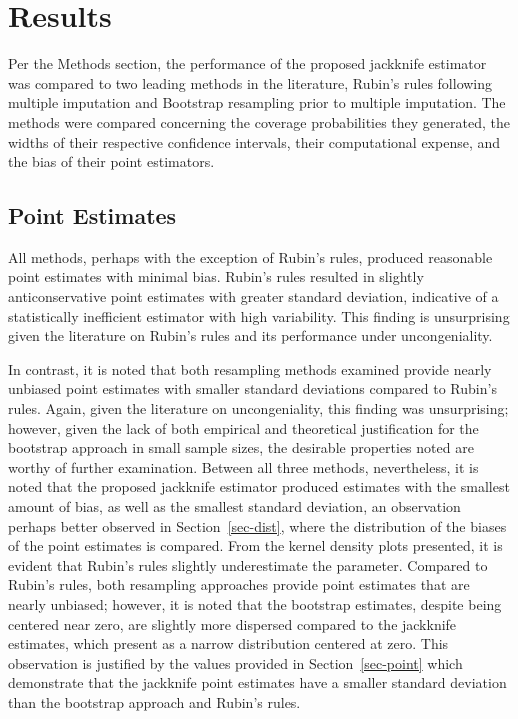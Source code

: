 \documentclass[
  letterpaper,
  DIV=11,
  numbers=noendperiod]{scrreprt}
\begin{document}

\hypertarget{results}{%
\chapter{Results}\label{results}}

Per the Methods section, the performance of the proposed jackknife
estimator was compared to two leading methods in the literature, Rubin's
rules following multiple imputation and Bootstrap resampling prior to
multiple imputation. The methods were compared concerning the coverage
probabilities they generated, the widths of their respective confidence
intervals, their computational expense, and the bias of their point
estimators.

\hypertarget{point-estimates}{%
\section{Point Estimates}\label{point-estimates}}

All methods, perhaps with the exception of Rubin's rules, produced
reasonable point estimates with minimal bias. Rubin's rules resulted in
slightly anticonservative point estimates with greater standard
deviation, indicative of a statistically inefficient estimator with high
variability. This finding is unsurprising given the literature on
Rubin's rules and its performance under uncongeniality.

In contrast, it is noted that both resampling methods examined provide
nearly unbiased point estimates with smaller standard deviations
compared to Rubin's rules. Again, given the literature on
uncongeniality, this finding was unsurprising; however, given the lack
of both empirical and theoretical justification for the bootstrap
approach in small sample sizes, the desirable properties noted are
worthy of further examination. Between all three methods, nevertheless,
it is noted that the proposed jackknife estimator produced estimates
with the smallest amount of bias, as well as the smallest standard
deviation, an observation perhaps better observed in
Section~\ref{sec-dist}, where the distribution of the biases of the
point estimates is compared. From the kernel density plots presented, it
is evident that Rubin's rules slightly underestimate the parameter.
Compared to Rubin's rules, both resampling approaches provide point
estimates that are nearly unbiased; however, it is noted that the
bootstrap estimates, despite being centered near zero, are slightly more
dispersed compared to the jackknife estimates, which present as a narrow
distribution centered at zero. This observation is justified by the
values provided in Section~\ref{sec-point} which demonstrate that the
jackknife point estimates have a smaller standard deviation than the
bootstrap approach and Rubin's rules.
\end{document}
